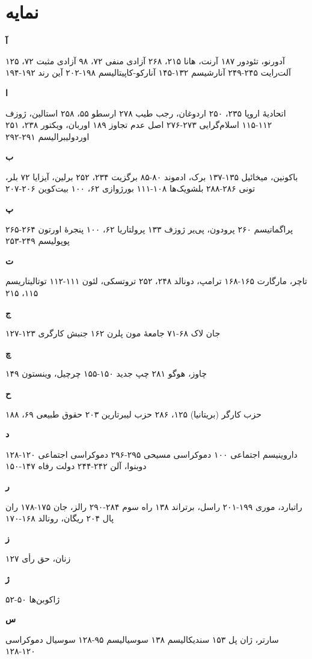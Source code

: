 \chapter*{نمایه}


\footnotesize

\textbf{آ}

آدورنو، تئودور ۱۸۷
آرنت، هانا ۲۱۵، ۲۶۸
آزادی منفی ۷۲، ۹۸
آزادی مثبت ۷۲، ۱۲۵
آلت‌رایت ۲۴۵-۲۴۹
آنارشیسم ۱۳۲-۱۴۵
آنارکو-کاپیتالیسم ۱۹۸-۲۰۲
آین رند ۱۹۲-۱۹۴

\textbf{ا}

اتحادیهٔ اروپا ۲۳۵، ۲۵۰
اردوغان، رجب طیب ۲۷۸
ارسطو ۵۵، ۲۵۸
استالین، ژوزف ۱۱۲-۱۱۵
اسلام‌گرایی ۲۷۳-۲۷۶
اصل عدم تجاوز ۱۸۹
اوربان، ویکتور ۲۳۸، ۲۵۱
اوردولیبرالیسم ۲۹۱-۲۹۲

\textbf{ب}

باکونین، میخائیل ۱۳۵-۱۳۷
برک، ادموند ۸۰-۸۵
برگزیت ۲۳۴، ۲۵۲
برلین، آیزایا ۷۲
بلر، تونی ۲۸۶-۲۸۸
بلشویک‌ها ۱۰۸-۱۱۱
بورژوازی ۶۲، ۱۰۰
بیت‌کوین ۲۰۶-۲۰۷

\textbf{پ}

پراگماتیسم ۲۶۰
پرودون، پی‌یر ژوزف ۱۳۳
پرولتاریا ۶۲، ۱۰۰
پنجرهٔ اورتون ۲۶۴-۲۶۵
پوپولیسم ۲۴۹-۲۵۳

\textbf{ت}

تاچر، مارگارت ۱۶۵-۱۶۸
ترامپ، دونالد ۲۴۸، ۲۵۲
تروتسکی، لئون ۱۱۱-۱۱۲
توتالیتاریسم ۱۱۵، ۲۱۵

\textbf{ج}

جان لاک ۶۸-۷۱
جامعهٔ مون پلرن ۱۶۲
جنبش کارگری ۱۲۳-۱۲۷

\textbf{چ}

چاوز، هوگو ۲۸۱
چپ جدید ۱۵۰-۱۵۵
چرچیل، وینستون ۱۴۹

\textbf{ح}

حزب کارگر (بریتانیا) ۱۲۵، ۲۸۶
حزب لیبرتارین ۲۰۳
حقوق طبیعی ۶۹، ۱۸۸

\textbf{د}

داروینیسم اجتماعی ۱۰۰
دموکراسی مسیحی ۲۹۵-۲۹۶
دموکراسی اجتماعی ۱۲۰-۱۲۸
دوبنوا، آلن ۲۴۲-۲۴۴
دولت رفاه ۱۴۷-۱۵۰

\textbf{ر}

راتبارد، موری ۱۹۹-۲۰۱
راسل، برتراند ۱۳۸
راه سوم ۲۸۴-۲۹۰
رالز، جان ۱۷۵-۱۷۸
ران پال ۲۰۴
ریگان، رونالد ۱۶۸-۱۷۰

\textbf{ز}

زنان، حق رأی ۱۲۷

\textbf{ژ}

ژاکوبن‌ها ۵۰-۵۲

\textbf{س}

سارتر، ژان پل ۱۵۳
سندیکالیسم ۱۳۸
سوسیالیسم ۹۵-۱۲۸
سوسیال دموکراسی ۱۲۰-۱۲۸

